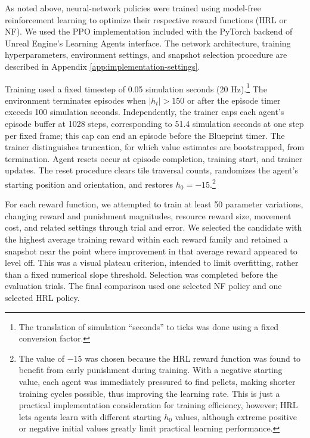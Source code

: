 \documentclass[12pt,fleqn]{article}
\begin{document}
As noted above, neural-network policies were trained using model-free reinforcement learning to optimize their respective reward functions (HRL or NF). We used the PPO implementation \cite{schulman_proximal_2017} included with the PyTorch backend of Unreal Engine's Learning Agents interface. The network architecture, training hyperparameters, environment settings, and snapshot selection procedure are described in Appendix \ref{app:implementation-settings}.

Training used a fixed timestep of 0.05 simulation seconds (20 Hz).\footnote{The translation of simulation ``seconds'' to ticks was done using a fixed conversion factor.} The environment terminates episodes when $|h_t|>150$ or after the episode timer exceeds 100 simulation seconds. Independently, the trainer caps each agent's episode buffer at 1028 steps, corresponding to 51.4 simulation seconds at one step per fixed frame; this cap can end an episode before the Blueprint timer. The trainer distinguishes truncation, for which value estimates are bootstrapped, from termination. Agent resets occur at episode completion, training start, and trainer updates. The reset procedure clears tile traversal counts, randomizes the agent's starting position and orientation, and restores $h_0=-15$.\footnote{The value of \(-15\) was chosen because the HRL reward function was found to benefit from early punishment during training. With a negative starting value, each agent was immediately pressured to find pellets, making shorter training cycles possible, thus improving the learning rate. This is just a practical implementation consideration for training efficiency, however; HRL lets agents learn with different starting \(h_0\) values, although extreme positive or negative initial values greatly limit practical learning performance.}

For each reward function, we attempted to train at least 50 parameter variations, changing reward and punishment magnitudes, resource reward size, movement cost, and related settings through trial and error. We selected the candidate with the highest average training reward within each reward family and retained a snapshot near the point where improvement in that average reward appeared to level off. This was a visual plateau criterion, intended to limit overfitting, rather than a fixed numerical slope threshold. Selection was completed before the evaluation trials. The final comparison used one selected NF policy and one selected HRL policy.

\end{document}

